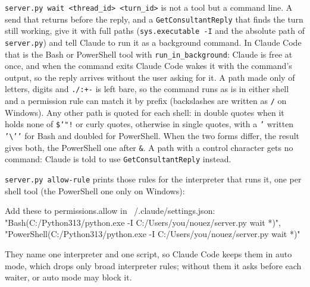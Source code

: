 \documentclass[10pt,a4paper]{article}
\newcommand{\code}[1]{\texttt{#1}}
\begin{document}
\code{server.py wait <thread\_id> <turn\_id>} is not a tool but a command line. A send that
returns before the reply, and a \code{GetConsultantReply} that finds the turn still working, give
it with full paths (\code{sys.executable -I} and the absolute path of \code{server.py}) and tell
Claude to run it as a background command. In Claude Code that is the Bash or PowerShell tool with
\code{run\_in\_background}: Claude is free at once, and when the command exits Claude Code wakes it
with the command's output, so the reply arrives without the user asking for it. A path made only
of letters, digits and \code{./:+-} is left bare, so the command runs as is in either shell and a
permission rule can match it by prefix (backslashes are written as \code{/} on Windows). Any other
path is quoted for each shell: in double quotes when it holds none of \code{\$`"!} or curly
quotes, otherwise in single quotes, with a \code{'} written \code{'\textbackslash'{}'} for Bash and
doubled for PowerShell. When the two forms differ, the result gives both, the PowerShell one after
\code{\&}. A path with a control character gets no command: Claude is told to use
\code{GetConsultantReply} instead.

\code{server.py allow-rule} prints those rules for the interpreter that runs it, one per shell tool
(the PowerShell one only on Windows):
\begin{plain}
Add these to permissions.allow in ~/.claude/settings.json:
"Bash(C:/Python313/python.exe -I C:/Users/you/nouez/server.py wait *)",
"PowerShell(C:/Python313/python.exe -I C:/Users/you/nouez/server.py wait *)"
\end{plain}
They name one interpreter and one script, so Claude Code keeps them in auto mode, which drops only
broad interpreter rules; without them it asks before each waiter, or auto mode may block it.
\end{document}
